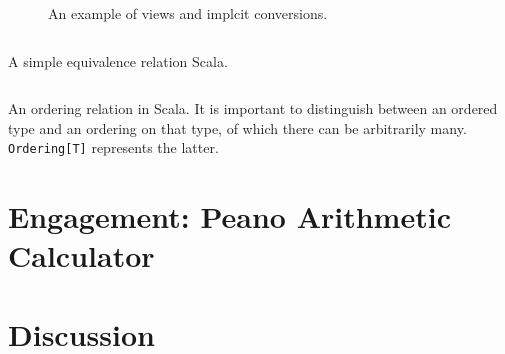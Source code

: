 \documentclass[jou,apacite]{IEEEtran}
\begin{document}
\begin{figure}
  \inputminted{Scala}{../examples/Set.scala}
  \caption{An example of views and implcit conversions.}
  \label{lst:nats-example}
\end{figure}



\begin{listing}
  \inputminted[firstline=3]{Scala}{../examples/Equiv.scala}
  \caption{A simple equivalence relation Scala.}
  \label{lst:equiv}
\end{listing}

\begin{listing}
  \inputminted[firstline=3]{Scala}{../examples/Ord.scala}
  \caption{An ordering relation in Scala. It is important to distinguish between
    an ordered type and an ordering on that type, of which there can be
    arbitrarily many. \texttt{Ordering[T]} represents the latter.}
  \label{lst:ordering}
\end{listing}




\section{Engagement: Peano Arithmetic Calculator}
\label{sec:engag-peano-arithm}

\section{Discussion}
\label{sec:discussion}
\end{document}
